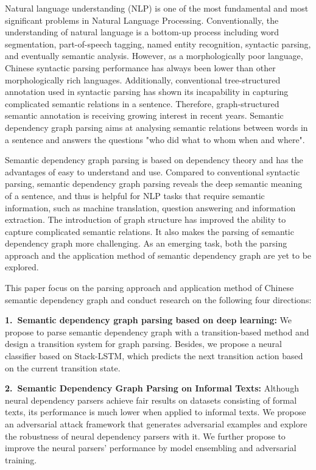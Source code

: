 \begin{eabstract}

Natural language understanding (NLP) is one of the most fundamental and most significant problems in Natural Language Processing. 
Conventionally, the understanding of natural language is a bottom-up process including word segmentation, part-of-speech tagging, named entity recognition, syntactic parsing, and eventually semantic analysis. 
However, as a morphologically poor language, Chinese syntactic parsing performance has always been lower than other morphologically rich languages. 
Additionally, conventional tree-structured annotation used in syntactic parsing has shown its incapability in capturing complicated semantic relations in a sentence. 
Therefore, graph-structured semantic annotation is receiving growing interest in recent years. 
Semantic dependency graph parsing aims at analysing semantic relations between words in a sentence and answers the questions "who did what to whom when and where". 

Semantic dependency graph parsing is based on dependency theory and has the advantages of easy to understand and use. 
Compared to conventional syntactic parsing, semantic dependency graph parsing reveals the deep semantic meaning of a sentence, and thus is helpful for NLP tasks that require semantic information, such as machine translation, question answering and information extraction. 
The introduction of graph structure has improved the ability to capture complicated semantic relations. 
It also makes the parsing of semantic dependency graph more challenging. 
As an emerging task, both the parsing approach and the application method of semantic dependency graph are yet to be explored. 

This paper focus on the parsing approach and application method of Chinese semantic dependency graph and conduct research on the following four directions: 

\textbf{1.\ Semantic dependency graph parsing based on deep learning:} 
We propose to parse semantic dependency graph with a transition-based method and design a transition system for graph parsing. 
Besides, we propose a neural classifier based on Stack-LSTM, which predicts the next transition action based on the current transition state. 

\textbf{2.\ Semantic Dependency Graph Parsing on Informal Texts:} 
Although neural dependency parsers achieve fair results on datasets consisting of formal texts, its performance is much lower when applied to informal texts. 
We propose an adversarial attack framework that generates adversarial examples and explore the robustness of neural dependency parsers with it. 
We further propose to improve the neural parsers' performance by model ensembling and adversarial training. 


\end{eabstract}
